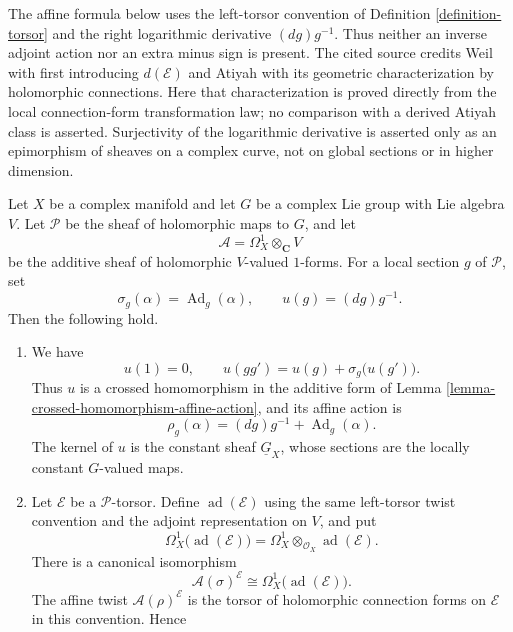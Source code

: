 \begin{lemma}
\label{lemma-holomorphic-logarithmic-derivative-obstruction}
\begin{reference}
\cite[Chapter III, \S 3.4, Remark 3, pp. 165--166]{Tohoku}
\end{reference}
\begin{history}
The affine formula below uses the left-torsor convention of
Definition \ref{definition-torsor} and the right logarithmic derivative
$(dg)g^{-1}$. Thus neither an inverse adjoint action nor an extra minus sign
is present. The cited source credits Weil with first introducing
$d(\mathcal E)$ and Atiyah with its geometric characterization by holomorphic
connections. Here that characterization is proved directly from the local
connection-form transformation law; no comparison with a derived Atiyah
class is asserted. Surjectivity of the logarithmic derivative is
asserted only as an epimorphism of sheaves on a complex curve, not on global
sections or in higher dimension.
\end{history}
Let $X$ be a complex manifold and let $G$ be a complex Lie group with Lie
algebra $V$. Let $\mathcal P$ be the sheaf of holomorphic maps to $G$, and
let
$$
\mathcal A=\Omega_X^1\otimes_{\mathbf C}V
$$
be the additive sheaf of holomorphic $V$-valued $1$-forms. For a local
section $g$ of $\mathcal P$, set
$$
\sigma_g(\alpha)=\operatorname{Ad}_g(\alpha),
\qquad
u(g)=(dg)g^{-1}.
$$
Then the following hold.
\begin{enumerate}
\item We have
$$
u(1)=0,
\qquad
u(gg')=u(g)+\sigma_g\bigl(u(g')\bigr).
$$
Thus $u$ is a crossed homomorphism in the additive form of
Lemma \ref{lemma-crossed-homomorphism-affine-action}, and its affine action
is
$$
\rho_g(\alpha)=(dg)g^{-1}+\operatorname{Ad}_g(\alpha).
$$
The kernel of $u$ is the constant sheaf $\underline G_X$, whose sections
are the locally constant $G$-valued maps.
\item Let $\mathcal E$ be a $\mathcal P$-torsor. Define
$\operatorname{ad}(\mathcal E)$ using the same left-torsor twist convention
and the adjoint representation on $V$, and put
$$
\Omega_X^1\bigl(\operatorname{ad}(\mathcal E)\bigr)
=\Omega_X^1\otimes_{\mathcal O_X}\operatorname{ad}(\mathcal E).
$$
There is a canonical isomorphism
$$
\mathcal A(\sigma)^{\mathcal E}
\cong
\Omega_X^1\bigl(\operatorname{ad}(\mathcal E)\bigr).
$$
The affine twist $\mathcal A(\rho)^{\mathcal E}$ is the torsor of
holomorphic connection forms on $\mathcal E$ in this convention. Hence

\end{enumerate}
\end{lemma}
